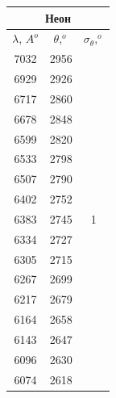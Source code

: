 \documentclass[a4paper,12pt]{report}
\begin{document}
\begin{table}[H]
\begin{tabular}{|ccc|}
\hline
\multicolumn{3}{|c|}{Неон}                                                      \\ \hline
\multicolumn{1}{|c|}{$\lambda$, $A^{o}$} & \multicolumn{1}{c|}{$\theta, ^{o}$} & $\sigma_{\theta}, ^{o}$         \\ \hline
\multicolumn{1}{|c|}{7032}   & \multicolumn{1}{c|}{2956}  & \multirow{25}{*}{1} \\ \cline{1-2}
\multicolumn{1}{|c|}{6929}   & \multicolumn{1}{c|}{2926}  &                     \\ \cline{1-2}
\multicolumn{1}{|c|}{6717}   & \multicolumn{1}{c|}{2860}  &                     \\ \cline{1-2}
\multicolumn{1}{|c|}{6678}   & \multicolumn{1}{c|}{2848}  &                     \\ \cline{1-2}
\multicolumn{1}{|c|}{6599}   & \multicolumn{1}{c|}{2820}  &                     \\ \cline{1-2}
\multicolumn{1}{|c|}{6533}   & \multicolumn{1}{c|}{2798}  &                     \\ \cline{1-2}
\multicolumn{1}{|c|}{6507}   & \multicolumn{1}{c|}{2790}  &                     \\ \cline{1-2}
\multicolumn{1}{|c|}{6402}   & \multicolumn{1}{c|}{2752}  &                     \\ \cline{1-2}
\multicolumn{1}{|c|}{6383}   & \multicolumn{1}{c|}{2745}  &                     \\ \cline{1-2}
\multicolumn{1}{|c|}{6334}   & \multicolumn{1}{c|}{2727}  &                     \\ \cline{1-2}
\multicolumn{1}{|c|}{6305}   & \multicolumn{1}{c|}{2715}  &                     \\ \cline{1-2}
\multicolumn{1}{|c|}{6267}   & \multicolumn{1}{c|}{2699}  &                     \\ \cline{1-2}
\multicolumn{1}{|c|}{6217}   & \multicolumn{1}{c|}{2679}  &                     \\ \cline{1-2}
\multicolumn{1}{|c|}{6164}   & \multicolumn{1}{c|}{2658}  &                     \\ \cline{1-2}
\multicolumn{1}{|c|}{6143}   & \multicolumn{1}{c|}{2647}  &                     \\ \cline{1-2}
\multicolumn{1}{|c|}{6096}   & \multicolumn{1}{c|}{2630}  &                     \\ \cline{1-2}
\multicolumn{1}{|c|}{6074}   & \multicolumn{1}{c|}{2618}  &                     \\ \cline{1-2}

\end{tabular}
\end{table}
\end{document}
